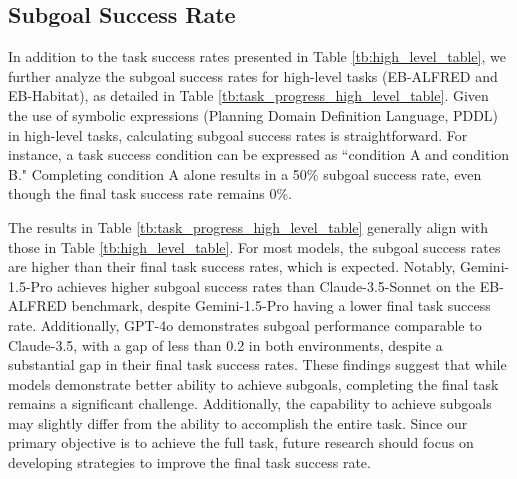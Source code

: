
\subsection{Subgoal Success Rate}\label{ap:subgoal}
In addition to the task success rates presented in Table \ref{tb:high_level_table}, we further analyze the subgoal success rates for high-level tasks (EB-ALFRED and EB-Habitat), as detailed in Table \ref{tb:task_progress_high_level_table}. Given the use of symbolic expressions (Planning Domain Definition Language, PDDL) in high-level tasks, calculating subgoal success rates is straightforward. For instance, a task success condition can be expressed as ``condition A and condition B." Completing condition A alone results in a 50\% subgoal success rate, even though the final task success rate remains 0\%.

The results in Table \ref{tb:task_progress_high_level_table} generally align with those in Table \ref{tb:high_level_table}. For most models, the subgoal success rates are higher than their final task success rates, which is expected. Notably, Gemini-1.5-Pro achieves higher subgoal success rates than Claude-3.5-Sonnet on the EB-ALFRED benchmark, despite Gemini-1.5-Pro having a lower final task success rate. Additionally, GPT-4o demonstrates subgoal performance comparable to Claude-3.5, with a gap of less than 0.2 in both environments, despite a substantial gap in their final task success rates. These findings suggest that while models demonstrate better ability to achieve subgoals, completing the final task remains a significant challenge. Additionally, the capability to achieve subgoals may slightly differ from the ability to accomplish the entire task. Since our primary objective is to achieve the full task, future research should focus on developing strategies to improve the final task success rate.



